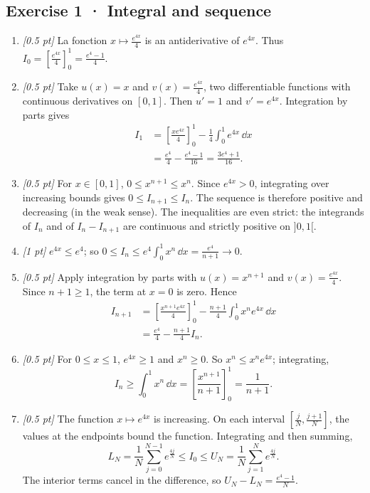 \subsection*{Exercise 1 · Integral and sequence}\begin{enumerate}

\item \textit{[0.5 pt]} La fonction $x\mapsto \frac{e^{4x}}{4}$ is an antiderivative of $e^{4x}$. Thus $I_0=[\frac{e^{4x}}{4}]_0^1=\frac{e^{4}-1}{4}$.

\item \textit{[0.5 pt]} Take $u(x)=x$ and $v(x)=\frac{e^{4x}}{4}$, two differentiable functions with continuous derivatives on $[0,1]$. Then $u'=1$ and $v'=e^{4x}$. Integration by parts gives
\[\begin{aligned}I_1&=\left[\frac{xe^{4x}}{4}\right]_0^1-\frac{1}{4}\int_0^1e^{4x}\,\dd x\\&=\frac{e^{4}}{4}-\frac{e^{4}-1}{16}=\frac{3e^{4}+1}{16}.\end{aligned}\]

\item \textit{[0.5 pt]} For $x\in[0,1]$, $0\le x^{n+1}\le x^n$. Since $e^{4x}>0$, integrating over increasing bounds gives $0\le I_{n+1}\le I_n$. The sequence is therefore positive and decreasing (in the weak sense). The inequalities are even strict: the integrands of $I_n$ and of $I_n-I_{n+1}$ are continuous and strictly positive on $]0,1[$.

\item \textit{[1 pt]} $e^{4x}\le e^{4}$; so $0\le I_n\le e^{4}\int_0^1x^n\,\dd x=\frac{e^{4}}{n+1}\to0$.

\item \textit{[0.5 pt]} Apply integration by parts with $u(x)=x^{n+1}$ and $v(x)=\frac{e^{4x}}{4}$. Since $n+1\ge1$, the term at $x=0$ is zero. Hence
\[\begin{aligned}I_{n+1}&=\left[\frac{x^{n+1}e^{4x}}{4}\right]_0^1-\frac{n+1}{4}\int_0^1x^ne^{4x}\,\dd x\\&=\frac{e^{4}}{4}-\frac{n+1}{4}I_n.\end{aligned}\]

\item \textit{[0.5 pt]} For $0\le x\le1$, $e^{4x}\ge1$ and $x^n\ge0$. So $x^n\le x^ne^{4x}$; integrating,
\[I_n\ge\int_0^1x^n\,\dd x=\left[\frac{x^{n+1}}{n+1}\right]_0^1=\frac{1}{n+1}.\]

\item \textit{[0.5 pt]} The function $x\mapsto e^{4x}$ is increasing. On each interval $[\frac{j}{N},\frac{j+1}{N}]$, the values at the endpoints bound the function. Integrating and then summing,
\[L_N=\frac{1}{N}\sum_{j=0}^{N-1}e^{\frac{4j}{N}}\le I_0\le U_N=\frac{1}{N}\sum_{j=1}^Ne^{\frac{4j}{N}}.\]
The interior terms cancel in the difference, so $U_N-L_N=\frac{e^{4}-1}{N}$.


\end{enumerate}
